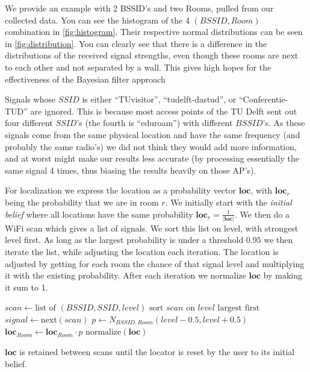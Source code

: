 \documentclass[a4paper,10pt,twoside]{IEEEtran}
\begin{document}
We provide an example with 2 BSSID's and two Rooms, pulled from our collected data.
You can see the histogram of the 4 $(BSSID, Room)$ combination in \autoref{fig:histogram}.
Their respective normal distributions can be seen in \autoref{fig:distribution}.
 You can clearly see that there is a difference in the distributions of the received signal strengths, even though these rooms are next to each other and not separated by a wall.
 This gives high hopes for the effectiveness of the Bayesian filter approach

Signals whose $SSID$ is either ``TUvisitor'', ``tudelft-dastud'',
or ``Conferentie-TUD'' are ignored.
This is because most access points of the TU Delft sent out four different $SSID$'s (the fourth is ``eduroam'') with different $BSSID$'s.
As these signals come from the same physical location and have the same
frequency (and probably the same radio's) we did not think they would add more
information, and at worst might make our results less accurate (by processing
essentially the same signal 4 times, thus biasing the results heavily on those AP's).

For localization we express the location as a probability vector $\mathbf{loc}$, with $\mathbf{loc}_{r}$ being the probability that we are in room $r$. 
We initially start with the \emph{initial belief} where all locations have the same probability $\mathbf{loc}_r = \frac{1}{|\mathbf{loc}|}$.
We then do a WiFi scan which gives a list of signals.
We sort this list on level, with strongest level first.
As long as the largest probability is under a threshold $0.95$ we then iterate the list, while adjusting the location each iteration.
The location is adjusted by getting for each room the chance of that signal level and multiplying it with the existing probability. After each iteration we normalize $\mathbf{loc}$ by making it sum to 1.
\\
\begin{algorithmic}
	\State $scan \gets \text{list of } (BSSID, SSID, level)$
	\State $\text{sort } scan \text{ on } level \text{ largest first}$
		\State $signal \gets \text{next}\left(scan\right)$
			\State $p \gets N_{BSSID,Room}(level-0.5,level+0.5)$
			\State $\mathbf{loc}_{Room} \gets \mathbf{loc}_{Room} \cdot p $
		\EndFor
		\State $\text{normalize}\left(\mathbf{loc}\right)$
	\EndWhile
\end{algorithmic}

$\mathbf{loc}$ is retained between scans until the locator is reset by the user to its initial belief.
\end{document}
